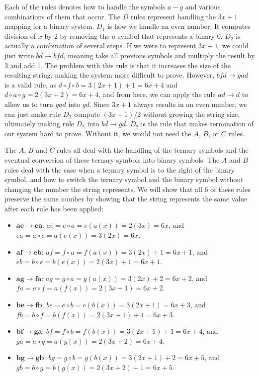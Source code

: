 Each of the rules denotes how to handle the symbols $a-g$ and various combinations of them that occur. The $D$ rules represent handling the $3x+1$ mapping for a binary system. $D_1$ is how we handle an even number. It computes division of $x$ by 2 by removing the $a$ symbol that represents a binary 0. $D_2$ is actually a combination of several steps. If we were to represent $3x+1$, we could just write $bd \rightarrow bfd$, meaning take all previous symbols and multiply the result by 3 and add 1. The problem with this rule is that it increases the size of the resulting string, making the system more difficult to prove. However, $bfd \rightarrow gad$ is a valid rule,  as $d \circ f \circ b = 3(2x+1)+1 = 6x+4$ and $d \circ a \circ g = 2(3x+2) = 6x+4$, and from here, we can apply the rule $ad \rightarrow d$ to allow us to turn $gad$ into $gd$. Since $3x+1$ always results in an even number, we can just make rule $D_2$ compute $(3x+1)/2$ without growing the string size, ultimately making rule $D_2$ into $bd \rightarrow gd$. $D_2$ is the rule that makes termination of our system hard to prove. Without it, we would not need the $A$, $B$, or $C$ rules.\par
The $A$, $B$ and $C$ rules all deal with the handling of the ternary symbols and the eventual conversion of these ternary symbols into binary symbols. The $A$ and $B$ rules deal with the case when a ternary symbol is to the right of the binary symbol, and how to switch the ternary symbol and the binary symbol without changing the number the string represents. We will show that all 6 of these rules preserve the same number by showing that the string represents the same value after each rule has been applied:
\begin{itemize}
    \item $\boldsymbol{ae \rightarrow ea}$: $ae = e \circ a = e(a(x)) = 2(3x) = 6x$, and $ea = a
    \circ e = a(e(x)) = 3(2x) = 6x$.
    \item $\boldsymbol{af \rightarrow eb}$: $af = f \circ a = f(a(x)) = 3(2x)+1 = 6x+1$, and $eb =
    b \circ e = b(e(x)) = 2(3x)+1 = 6x+1$.
    \item $\boldsymbol{ag \rightarrow fa}$: $ag = g \circ a = g(a(x)) = 3(2x)+2 = 6x+2$, and $fa = a \circ f = a(f(x)) = 2(3x+1) = 6x+2$.
    \item $\boldsymbol{be \rightarrow fb}$: $be = e \circ b = e(b(x)) = 3(2x+1) = 6x+3$, and $fb = b \circ f = b(f(x)) = 2(3x+1)+1 = 6x+3$.
    \item $\boldsymbol{bf \rightarrow ga}$: $bf = f \circ b = f(b(x)) = 3(2x+1)+1 = 6x+4$, and $ga =  a \circ g = a(g(x)) = 2(3x+2) = 6x+4$.
    \item $\boldsymbol{bg \rightarrow gb}$: $bg = g \circ b = g(b(x)) = 3(2x+1)+2 = 6x+5$, and $gb = b \circ g = b(g(x)) = 2(3x+2)+1 = 6x+5$.
\end{itemize}
